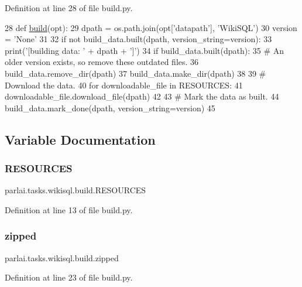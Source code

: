 Definition at line 28 of file build.\+py.


\begin{DoxyCode}
28 \textcolor{keyword}{def }\hyperlink{namespacedialog__babi__feedback_1_1build_a7a9d289f7493a5ded13c4b7f071b6184}{build}(opt):
29     dpath = os.path.join(opt[\textcolor{stringliteral}{'datapath'}], \textcolor{stringliteral}{'WikiSQL'})
30     version = \textcolor{stringliteral}{'None'}
31 
32     \textcolor{keywordflow}{if} \textcolor{keywordflow}{not} build\_data.built(dpath, version\_string=version):
33         print(\textcolor{stringliteral}{'[building data: '} + dpath + \textcolor{stringliteral}{']'})
34         \textcolor{keywordflow}{if} build\_data.built(dpath):
35             \textcolor{comment}{# An older version exists, so remove these outdated files.}
36             build\_data.remove\_dir(dpath)
37         build\_data.make\_dir(dpath)
38 
39         \textcolor{comment}{# Download the data.}
40         \textcolor{keywordflow}{for} downloadable\_file \textcolor{keywordflow}{in} RESOURCES:
41             downloadable\_file.download\_file(dpath)
42 
43         \textcolor{comment}{# Mark the data as built.}
44         build\_data.mark\_done(dpath, version\_string=version)
45 \end{DoxyCode}


\subsection{Variable Documentation}
\mbox{\label{namespaceparlai_1_1tasks_1_1wikisql_1_1build_a6f28762458bfec32a46855606ded0884}} 
\subsubsection{\texorpdfstring{R\+E\+S\+O\+U\+R\+C\+ES}{RESOURCES}}
{\footnotesize\ttfamily parlai.\+tasks.\+wikisql.\+build.\+R\+E\+S\+O\+U\+R\+C\+ES}



Definition at line 13 of file build.\+py.

\mbox{\label{namespaceparlai_1_1tasks_1_1wikisql_1_1build_a614a315fb0a0058a5fc597be60bffe00}} 
\subsubsection{\texorpdfstring{zipped}{zipped}}
{\footnotesize\ttfamily parlai.\+tasks.\+wikisql.\+build.\+zipped}



Definition at line 23 of file build.\+py.

